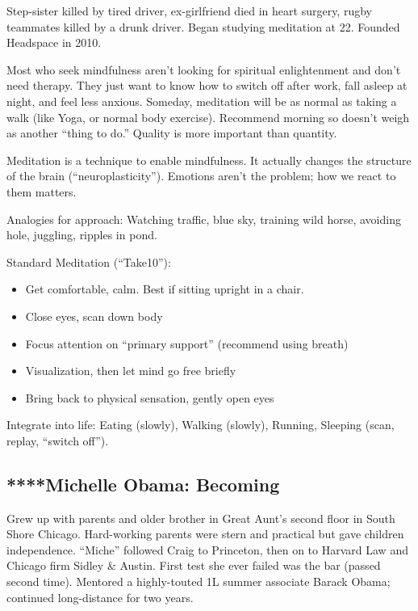 \documentclass[
]{article}
\begin{document}
Step-sister killed by tired driver, ex-girlfriend died in heart surgery,
rugby teammates killed by a drunk driver. Began studying meditation at
22. Founded Headspace in 2010.

Most who seek mindfulness aren't looking for spiritual enlightenment and
don't need therapy. They just want to know how to switch off after work,
fall asleep at night, and feel less anxious. Someday, meditation will be
as normal as taking a walk (like Yoga, or normal body exercise).
Recommend morning so doesn't weigh as another ``thing to do.'' Quality
is more important than quantity.

Meditation is a technique to enable mindfulness. It actually changes the
structure of the brain (``neuroplasticity''). Emotions aren't the
problem; how we react to them matters.

Analogies for approach: Watching traffic, blue sky, training wild horse,
avoiding hole, juggling, ripples in pond.

Standard Meditation (``Take10''):

\begin{itemize}
\item
  Get comfortable, calm. Best if sitting upright in a chair.
\item
  Close eyes, scan down body
\item
  Focus attention on ``primary support'' (recommend using breath)
\item
  Visualization, then let mind go free briefly
\item
  Bring back to physical sensation, gently open eyes
\end{itemize}

Integrate into life: Eating (slowly), Walking (slowly), Running,
Sleeping (scan, replay, ``switch off'').

\hypertarget{michelle-obama-becoming}{%
\subsection{****Michelle Obama:
Becoming}\label{michelle-obama-becoming}}

Grew up with parents and older brother in Great Aunt's second floor in
South Shore Chicago. Hard-working parents were stern and practical but
gave children independence. ``Miche'' followed Craig to Princeton, then
on to Harvard Law and Chicago firm Sidley \& Austin. First test she ever
failed was the bar (passed second time). Mentored a highly-touted 1L
summer associate Barack Obama; continued long-distance for two years.
\end{document}
